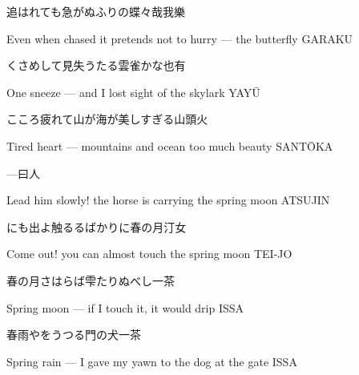 \begin{haiku}
    {\FH 追はれても急がぬふりの蝶々哉}\hfill{\FH 我樂}

    \vin{} Even when chased
    \vin{} \vin{} it pretends not to hurry ---
    \vin{} \vin{} \vin{} the butterfly \hspace{\fill} GARAKU
\end{haiku}

\begin{haiku}
    {\FH くさめして見失うたる雲雀かな}\hfill{\FH 也有}

    \vin{} One sneeze ---
    \vin{} \vin{} and I lost sight of
    \vin{} \vin{} \vin{} the skylark \hspace{\fill} YAY\={U}
\end{haiku}

\begin{haiku}
    {\FH こころ疲れて山が海が美しすぎる}\hfill{\FH 山頭火}

    \vin{} Tired heart ---
    \vin{} \vin{} mountains and ocean
    \vin{} \vin{} \vin{} too much beauty \hspace{\fill} SANT\={O}KA
\end{haiku}

\begin{haiku}
    {---}\hfill{\FH 曰人}

    \vin{} Lead him slowly!
    \vin{} \vin{} the horse is carrying
    \vin{} \vin{} \vin{} the spring moon \hspace{\fill} ATSUJIN
\end{haiku}

\begin{haiku}
    {\FH {}にも出よ触るるばかりに春の月}\hfill{\FH 汀女}

    \vin{} Come out!
    \vin{} \vin{} you can almost touch
    \vin{} \vin{} \vin{} the spring moon \hspace{\fill} TEI-JO
\end{haiku}

\begin{haiku}
    {\FH 春の月さはらば雫たりぬべし}\hfill{\FH 一茶}

    \vin{} Spring moon ---
    \vin{} \vin{} if I touch it, it would
    \vin{} \vin{} \vin{} drip \hspace{\fill} ISSA
\end{haiku}

\begin{haiku}
    {\FH 春雨やをうつる門の犬}\hfill{\FH 一茶}

    \vin{} Spring rain ---
    \vin{} \vin{} I gave my yawn
    \vin{} \vin{} \vin{} to the dog at the gate \hspace{\fill} ISSA
\end{haiku}

